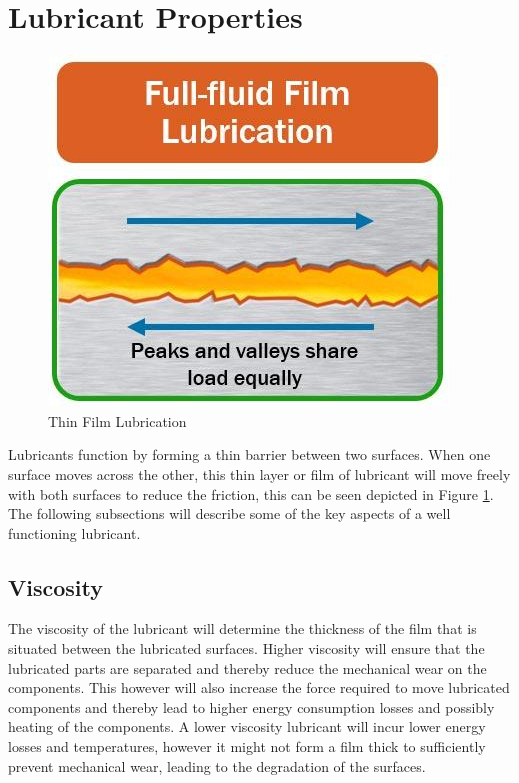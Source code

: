 \documentclass[a4paper,11pt]{article}
\begin{document}

\section{Lubricant Properties}

\begin{figure}
    \vspace{-60pt}
    \hspace{8pt}
    \includegraphics[width=0.9\linewidth]{film.jpeg} 
    \vspace{-10pt}
    \caption{Thin Film Lubrication}
    \vspace{-30pt}
    \label{film}
\end{figure}

Lubricants function by forming a thin barrier between two surfaces. When one surface moves across the other, this thin layer or film of lubricant will move freely with both surfaces to reduce the friction, this can be seen depicted in Figure \ref{film}. The following subsections will describe some of the key aspects of a well functioning lubricant.

\subsection{Viscosity}

The viscosity of the lubricant will determine the thickness of the film that is situated between the lubricated surfaces. Higher viscosity will ensure that the lubricated parts are separated and thereby reduce the mechanical wear on the components. This however will also increase the force required to move lubricated components and thereby lead to higher energy consumption losses and possibly heating of the components. A lower viscosity lubricant will incur lower energy losses and temperatures, however it might not form a film thick to sufficiently prevent mechanical wear, leading to the degradation of the surfaces. 
\end{document}
